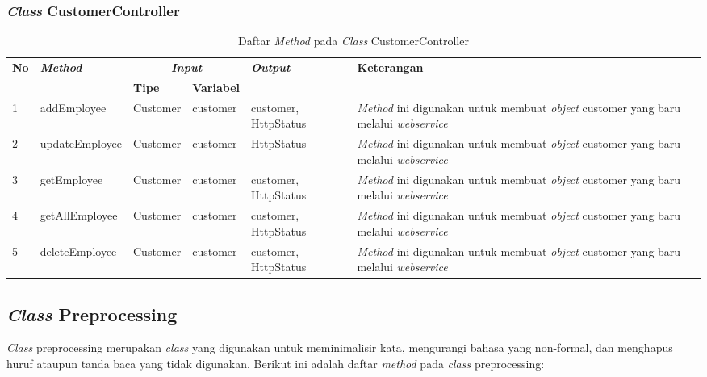\subsubsection{\textit{Class} CustomerController}
\begin{table}[H]
	\caption{Daftar \textit{Method} pada \textit{Class} CustomerController}
	\centering
	\small
	\begin{adjustbox}{width=1\textwidth}	
	\begin{tabular}{|p{0.4cm}|p{3.2cm}|p{1.4cm}|p{1.7cm}|p{1.55cm}|p{3cm}|}
		\hline
		\multirow{2}{*}{\textbf{No}} & \multirow{2}{*}{\textit{\textbf{Method}}} & \multicolumn{2}{c|}{\textit{\textbf{Input}}} & \multirow{2}{*}{\textit{\textbf{Output}}} & 
		\multirow{2}{*}{\textbf{Keterangan}}\\
		\cline{3-4}
		& & \textbf{Tipe} & \textbf{Variabel} & & \\
		\hline
		1 & addEmployee & Customer & customer & customer, HttpStatus & \textit{Method} ini digunakan untuk membuat \textit{object} customer yang baru melalui \textit{webservice}\\
		\hline
		2 & updateEmployee & Customer & customer & HttpStatus & \textit{Method} ini digunakan untuk membuat \textit{object} customer yang baru melalui \textit{webservice}\\
		\hline
		3 & getEmployee & Customer & customer & customer, HttpStatus & \textit{Method} ini digunakan untuk membuat \textit{object} customer yang baru melalui \textit{webservice}\\
		\hline
		4 & getAllEmployee & Customer & customer & customer, HttpStatus & \textit{Method} ini digunakan untuk membuat \textit{object} customer yang baru melalui \textit{webservice}\\
		\hline
		5 & deleteEmployee & Customer & customer & customer, HttpStatus & \textit{Method} ini digunakan untuk membuat \textit{object} customer yang baru melalui \textit{webservice}\\
		\hline
	\end{tabular}
	\end{adjustbox}
\end{table}
\subsection{\textit{Class} Preprocessing}
\textit{Class} preprocessing merupakan \textit{class} yang digunakan untuk meminimalisir kata, mengurangi bahasa yang non-formal, dan menghapus huruf ataupun tanda baca yang tidak digunakan. Berikut ini adalah daftar \textit{method }pada \textit{class} preprocessing:

